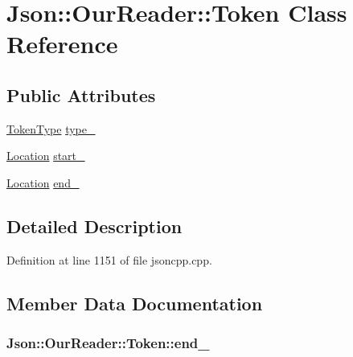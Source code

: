 \hypertarget{class_json_1_1_our_reader_1_1_token}{}\section{Json\+:\+:Our\+Reader\+:\+:Token Class Reference}
\label{class_json_1_1_our_reader_1_1_token}
\subsection*{Public Attributes}
\begin{DoxyCompactItemize}
\item 
\hyperlink{class_json_1_1_our_reader_a15116f7276ddf1e7a2cc3cbefa884dcc}{Token\+Type} \hyperlink{class_json_1_1_our_reader_1_1_token_abe7d858530396fa7e1293f7a579880ed}{type\+\_\+}
\item 
\hyperlink{class_json_1_1_our_reader_a1bdc7bbc52ba87cae6b19746f2ee0189}{Location} \hyperlink{class_json_1_1_our_reader_1_1_token_aedf68bb00eaaa9d3c22b9825999602ac}{start\+\_\+}
\item 
\hyperlink{class_json_1_1_our_reader_a1bdc7bbc52ba87cae6b19746f2ee0189}{Location} \hyperlink{class_json_1_1_our_reader_1_1_token_a67d2071638add857528579ae3791eccc}{end\+\_\+}
\end{DoxyCompactItemize}


\subsection{Detailed Description}


Definition at line 1151 of file jsoncpp.\+cpp.



\subsection{Member Data Documentation}
\subsubsection[{\texorpdfstring{end\+\_\+}{end_}}]{ Json\+::\+Our\+Reader\+::\+Token\+::end\+\_\+}\hypertarget{class_json_1_1_our_reader_1_1_token_a67d2071638add857528579ae3791eccc}{}\label{class_json_1_1_our_reader_1_1_token_a67d2071638add857528579ae3791eccc}


